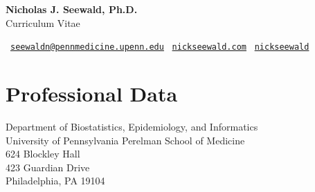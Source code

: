 \documentclass[letterpaper,11pt]{article} %
\begin{document}
	\begin{center}
		\headingfont
		\huge{\textbf{Nicholas J. Seewald, Ph.D.}} \\
		\Large{Curriculum Vitae}
	\end{center}
	
	\begin{center}
	 \  \href{mailto:nicholas.seewald@pennmedicine.upenn.edu}{\texttt{seewaldn@pennmedicine.upenn.edu}} \quad
	\faLaptop \  \href{https://www.nickseewald.com}{\texttt{nickseewald.com}} \quad
	\faGithub  \  \href{https://www.github.com/nickseewald}{\texttt{nickseewald}}
\end{center}


	\section*{Professional Data}

	\begin{minipage}[t]{.61\textwidth}
		Department of Biostatistics, Epidemiology, and Informatics \\
		University of Pennsylvania Perelman School of Medicine \\
		624 Blockley Hall \\
		423 Guardian Drive \\
		Philadelphia, PA 19104
	\end{minipage}

	\thispagestyle{firstpage} %

\end{document}

